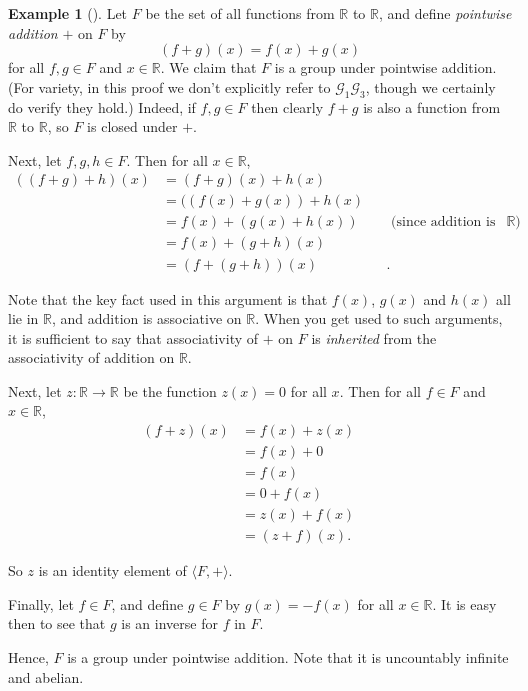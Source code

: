 \documentclass[10pt,]{book}
\theoremstyle{plain}
\theoremstyle{definition}
\theoremstyle{definition}
\theoremstyle{definition}
\newtheorem{example}[theorem]{Example}
\theoremstyle{definition}
\numberwithin{equation}{section}
\def\R{\mathbb{R}}
\def\G{\mathcal{G}}
\newcommand{\amp}{&}
\begin{document}
\begin{example}[]\label{example-19}
Let \(F\) be the set of all functions from \(\R\) to \(\R\), and define \emph{pointwise addition} \(+\) on \(F\) by%
\begin{equation*}
(f+g)(x)=f(x)+g(x)
\end{equation*}
for all \(f,g\in F\) and \(x\in \R\). We claim that \(F\) is a group under pointwise addition. (For variety, in this proof we don't explicitly refer to \(\G_1\)\textendash{}\(\G_3\), though we certainly do verify they hold.) Indeed, if \(f,g\in F\) then clearly \(f+g\) is also a function from \(\R\) to \(\R\), so \(F\) is closed under \(+\).%
\par
Next, let \(f,g,h\in F\). Then for all \(x\in \R\),%
\begin{align*}
((f+g)+h)(x)\amp =(f+g)(x)+h(x)\amp \amp\\
\amp =((f(x)+g(x))+h(x)\amp \amp\\
\amp =f(x)+(g(x)+h(x))\amp \amp \text{ (since addition is associative on
\(\R\)) }\\
\amp =f(x)+(g+h)(x)\amp \amp\\
\amp =(f+(g+h))(x)\amp \amp .
\end{align*}
%
\par
Note that the key fact used in this argument is that \(f(x)\), \(g(x)\) and \(h(x)\) all lie in \(\R\), and addition is associative on \(\R\). When you get used to such arguments, it is sufficient to say that associativity of \(+\) on \(F\) is \emph{inherited} from the associativity of addition on \(\R\).%
\par
Next, let \(z:\R\to\R\) be the function \(z(x)=0\) for all \(x\). Then for all \(f\in F\) and \(x\in \R\),%
\begin{align*}
(f+z)(x)\amp =f(x)+z(x)\amp \amp\\
\amp =f(x)+0\amp \amp\\
\amp =f(x)\amp \amp \\
\amp =0+f(x)\amp \amp\\
\amp =z(x)+f(x)\amp \amp\\
\amp = (z+f)(x).
\end{align*}
%
\par
So \(z\) is an identity element of \(\langle F,+\rangle\).%
\par
Finally, let \(f\in F\), and define \(g\in F\) by \(g(x)=-f(x)\) for all \(x\in \R\). It is easy then to see that \(g\) is an inverse for \(f\) in \(F\).%
\par
Hence, \(F\) is a group under pointwise addition. Note that it is uncountably infinite and abelian.%
\end{example}
\end{document}
